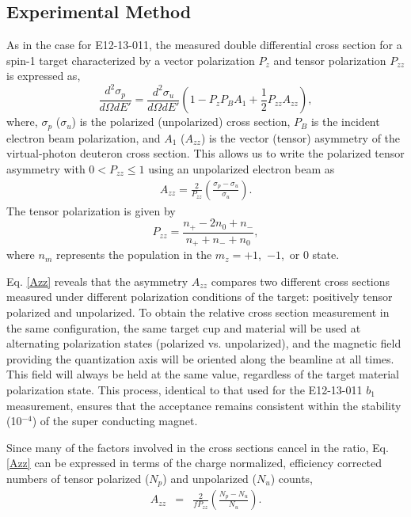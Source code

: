 \subsection{Experimental Method} %

As in the case for E12-13-011, the measured double differential cross section for a spin-1 target characterized by a vector polarization $P_{z}$ and tensor polarization
$P_{zz}$ is expressed as,
\begin{equation}
\frac{d^2\sigma_p}{d\Omega dE'}=\frac{d^2\sigma_u}{d\Omega dE'}\left(1-P_zP_BA_1+\frac{1}{2}P_{zz}A_{zz}\right),
\label{eq:one}
\end{equation}
where, $\sigma_p$ ($\sigma_u$) is the polarized (unpolarized) cross section, $P_B$ is the incident electron beam polarization, and $A_1$ ($A_{zz}$) is the
vector (tensor) asymmetry of the virtual-photon deuteron cross section.  This allows us to write
the polarized tensor asymmetry with $0<P_{zz}\leq 1$ using an unpolarized electron beam as
\begin{eqnarray}
\label{Azz}
A_{zz} = \frac{2}{P_{zz}}\left(\frac{\sigma_p - \sigma_u}{\sigma_u}\right).
\end{eqnarray}
The tensor polarization is given by 
\begin{equation}
P_{zz}=\frac{n_+-2n_0+n_-}{n_++n_-+n_0},
\end{equation}
where $n_m$ represents the population in the $m_z=+1$,~$-1$,~or $0$ state.

Eq. \ref{Azz} reveals that the asymmetry $A_{zz}$ compares two different cross sections measured under different polarization conditions of the target: positively tensor polarized and unpolarized.  
To obtain the relative cross section measurement in the same configuration, the same target cup and material will be used at alternating polarization states (polarized vs. unpolarized),  and the magnetic field providing the quantization axis will be oriented along the beamline at all times.
This field will always be held at the same value, regardless of the target material polarization state. 
This process, identical to that used for the E12-13-011 $b_1$ measurement, ensures that the acceptance remains consistent within the stability (10$^{-4}$) of the super conducting magnet.  


Since many of the factors involved in the cross sections cancel in
the ratio, Eq. \ref{Azz} can be expressed in terms 
of the charge normalized, efficiency corrected numbers of tensor polarized ($N_p$) and unpolarized ($N_u$) counts, 
\begin{eqnarray} \label{3}
A_{zz}&=&\frac{2}{fP_{zz}}\left(\frac{N_p - N_u}{N_u}\right) .
\end{eqnarray}

